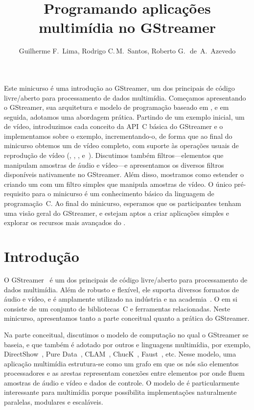 \documentclass{SBCbookchapter}
\title{Programando aplicações multimídia no GStreamer}
\author{%
  Guilherme F\null.~Lima,
  Rodrigo C\null.\,M.~Santos,
  Roberto G\null.\,~de~A.~Azevedo
}
\begin{document}
\maketitle
{}\baselineskip\strut
\begin{abstract}
  
\end{abstract}
\begin{resumo}
  Este minicurso é uma introdução ao GStreamer, um dos principais
   de código livre/aberto para processamento de dados
  multimídia.  Começamos apresentando o GStreamer, sua arquitetura e modelo
  de programação baseado em , e em seguida, adotamos uma
  abordagem prática.  Partindo de um exemplo inicial, um  de
  vídeo, introduzimos cada conceito da API~C básica do GStreamer e o
  implementamos sobre o exemplo, incrementando-o, de forma que ao final do
  minicurso obtemos um  de vídeo completo, com suporte às
  operações usuais de reprodução de vídeo (, , ,
   e~).  Discutimos também filtros---elementos
  que manipulam amostras de áudio e vídeo---e apresentamos os diversos
  filtros disponíveis nativamente no GStreamer.  Além disso, mostramos como
  estender o  criando um  com um filtro simples que
  manipula amostras de vídeo.  O único pré-requisito para o minicurso é um
  conhecimento básico da linguagem de programação~C\null.  Ao final do
  minicurso, esperamos que os participantes tenham uma visão geral do
  GStreamer, e estejam aptos a criar aplicações simples e explorar os
  recursos mais avançados do .
\end{resumo}


\section{Introdução}
\label{sec:intro}

O GStreamer~\cite{gstreamer} é um dos principais  de código
livre/aberto para processamento de dados multimídia.  Além de robusto e
flexível, ele suporta diversos formatos de áudio e vídeo, e é amplamente
utilizado na indústria e na academia~\cite{gstreamer-apps}.
O  em si consiste de um conjunto de bibliotecas~C e
ferramentas relacionadas.  Neste minicurso, apresentamos tanto a parte
conceitual quanto a prática do GStreamer.

Na parte conceitual, discutimos o modelo de computação  no qual
o GStreamer se baseia, e que também é adotado por outros  e
linguagens multimídia, por exemplo, DirectShow~\cite{Chatterjee-A-1997},
Pure Data~\cite{Puckette-M-S-2007}, CLAM~\cite{Amatriain-X-2008},
ChucK~\cite{Wang-G-2003}, Faust~\cite{Orlarey-Y-2009}, etc.  Nesse modelo,
uma aplicação multimídia estrutura-se como um grafo em que os nós são
elementos processadores e as arestas representam conexões entre elementos
por onde fluem amostras de áudio e vídeo e dados de controle.  O modelo de
 é particularmente interessante para multimídia porque
possibilita implementações naturalmente paralelas, modulares e escaláveis.
\end{document}
